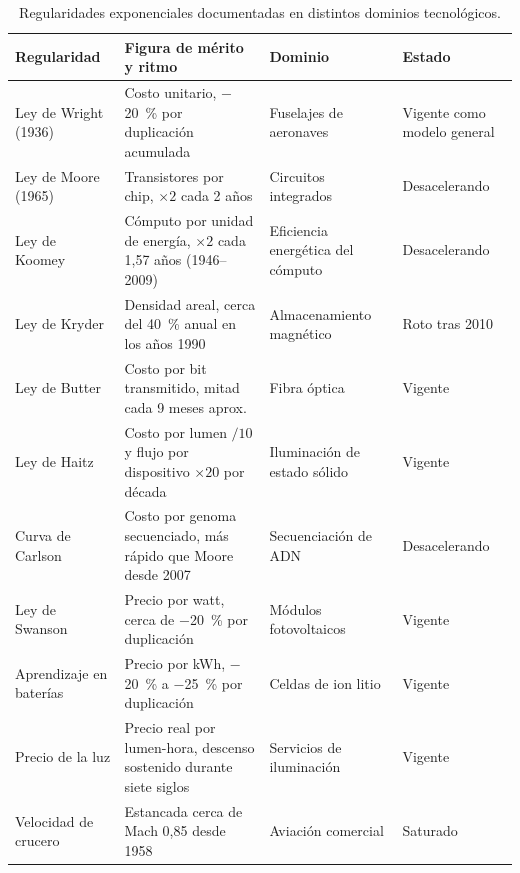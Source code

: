 \documentclass[11pt,letterpaper]{article}
\begin{document}
\begin{table}[ht]
  \centering
  \small
  \caption{Regularidades exponenciales documentadas en distintos dominios
  tecnológicos.}
  \label{tab:leyes}
  \begin{tabularx}{\textwidth}{@{}>{\raggedright\arraybackslash}p{} >{\raggedright\arraybackslash}X >{\raggedright\arraybackslash}p{} l@{}}
    \toprule
    \textbf{Regularidad} & \textbf{Figura de mérito y ritmo} &
    \textbf{Dominio} & \textbf{Estado} \\
    \midrule
    Ley de Wright (1936)
      & Costo unitario, $-$\SI{20}{\percent} por duplicación acumulada
      & Fuselajes de aeronaves & Vigente como modelo general \\
    Ley de Moore (1965)
      & Transistores por chip, $\times 2$ cada 2 años
      & Circuitos integrados & Desacelerando \\
    Ley de Koomey
      & Cómputo por unidad de energía, $\times 2$ cada 1,57 años (1946--2009)
      & Eficiencia energética del cómputo & Desacelerando \\
    Ley de Kryder
      & Densidad areal, cerca del \SI{40}{\percent} anual en los años 1990
      & Almacenamiento magnético & Roto tras 2010 \\
    Ley de Butter
      & Costo por bit transmitido, mitad cada 9 meses aprox.
      & Fibra óptica & Vigente \\
    Ley de Haitz
      & Costo por lumen $/10$ y flujo por dispositivo $\times 20$ por década
      & Iluminación de estado sólido & Vigente \\
    Curva de Carlson
      & Costo por genoma secuenciado, más rápido que Moore desde 2007
      & Secuenciación de ADN & Desacelerando \\
    Ley de Swanson
      & Precio por watt, cerca de $-$\SI{20}{\percent} por duplicación
      & Módulos fotovoltaicos & Vigente \\
    Aprendizaje en baterías
      & Precio por kWh, $-$\SI{20}{\percent} a $-$\SI{25}{\percent} por duplicación
      & Celdas de ion litio & Vigente \\
    Precio de la luz
      & Precio real por lumen-hora, descenso sostenido durante siete siglos
      & Servicios de iluminación & Vigente \\
    Velocidad de crucero
      & Estancada cerca de Mach 0,85 desde 1958
      & Aviación comercial & Saturado \\
    \bottomrule
  \end{tabularx}
\end{table}
\end{document}
